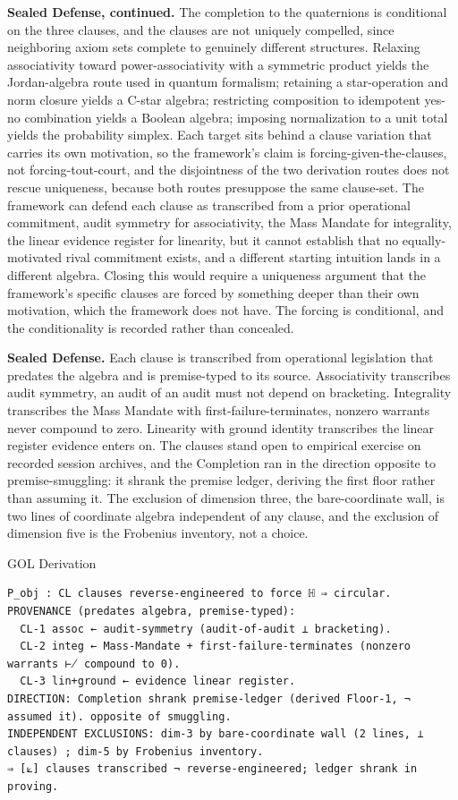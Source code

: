 \documentclass[10pt,twocolumn]{article}
\begin{document}
\textbf{Sealed Defense, continued.} The completion to the quaternions is
conditional on the three clauses, and the clauses are not uniquely
compelled, since neighboring axiom sets complete to genuinely different
structures. Relaxing associativity toward power-associativity with a
symmetric product yields the Jordan-algebra route used in quantum
formalism; retaining a star-operation and norm closure yields a C-star
algebra; restricting composition to idempotent yes-no combination yields
a Boolean algebra; imposing normalization to a unit total yields the
probability simplex. Each target sits behind a clause variation that
carries its own motivation, so the framework's claim is
forcing-given-the-clauses, not forcing-tout-court, and the disjointness
of the two derivation routes does not rescue uniqueness, because both
routes presuppose the same clause-set. The framework can defend each
clause as transcribed from a prior operational commitment, audit
symmetry for associativity, the Mass Mandate for integrality, the linear
evidence register for linearity, but it cannot establish that no
equally-motivated rival commitment exists, and a different starting
intuition lands in a different algebra. Closing this would require a
uniqueness argument that the framework's specific clauses are forced by
something deeper than their own motivation, which the framework does not
have. The forcing is conditional, and the conditionality is recorded
rather than concealed.

\textbf{Sealed Defense.} Each clause is transcribed from operational
legislation that predates the algebra and is premise-typed to its
source. Associativity transcribes audit symmetry, an audit of an audit
must not depend on bracketing. Integrality transcribes the Mass Mandate
with first-failure-terminates, nonzero warrants never compound to zero.
Linearity with ground identity transcribes the linear register evidence
enters on. The clauses stand open to empirical exercise on recorded
session archives, and the Completion ran in the direction opposite to
premise-smuggling: it shrank the premise ledger, deriving the first
floor rather than assuming it. The exclusion of dimension three, the
bare-coordinate wall, is two lines of coordinate algebra independent of
any clause, and the exclusion of dimension five is the Frobenius
inventory, not a choice.

\begin{golbox}{GOL Derivation}
\begin{lstlisting}[style=golv]
P_obj : CL clauses reverse-engineered to force ℍ ⇒ circular.
PROVENANCE (predates algebra, premise-typed):
  CL-1 assoc ← audit-symmetry (audit-of-audit ⊥ bracketing).
  CL-2 integ ← Mass-Mandate + first-failure-terminates (nonzero warrants ⊬ compound to 0).
  CL-3 lin+ground ← evidence linear register.
DIRECTION: Completion shrank premise-ledger (derived Floor-1, ¬ assumed it). opposite of smuggling.
INDEPENDENT EXCLUSIONS: dim-3 by bare-coordinate wall (2 lines, ⊥ clauses) ; dim-5 by Frobenius inventory.
⇒ [⟀] clauses transcribed ¬ reverse-engineered; ledger shrank in proving.
\end{lstlisting}
\end{golbox}
\end{document}
